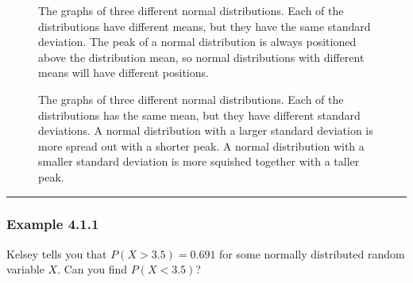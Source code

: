 \documentclass[letterpaper,10pt,english]{jupyterBook}
\begin{document}
\begin{figure}[htbp]
\centering
\capstart

\noindent{}
\caption{The graphs of three different normal distributions. Each of the distributions have different means, but they have the same standard deviation. The peak of a normal distribution is always positioned above the distribution mean, so normal distributions with different means will have different positions.}\label{\detokenize{Ch4 The Normal Distribution and the Central Limit Theorem/4.1 Properties of the Normal Distribution:normals-diff-means}}\end{figure}

\begin{figure}[htbp]
\centering
\capstart

\noindent{}
\caption{The graphs of three different normal distributions. Each of the distributions has the same mean, but they have different standard deviations. A normal distribution with a larger standard deviation is more spread out with a shorter peak. A normal distribution with a smaller standard deviation is more squished together with a taller peak.}\label{\detokenize{Ch4 The Normal Distribution and the Central Limit Theorem/4.1 Properties of the Normal Distribution:normals-diff-sd}}\end{figure}


\bigskip\hrule\bigskip



\subsubsection{Example 4.1.1}
\label{\detokenize{Ch4 The Normal Distribution and the Central Limit Theorem/4.1 Properties of the Normal Distribution:example-4-1-1}}
\sphinxAtStartPar
Kelsey tells you that \(P(X > 3.5) = 0.691\) for some normally distributed random variable \(X\). Can you find \(P(X < 3.5)\)?
\end{document}
